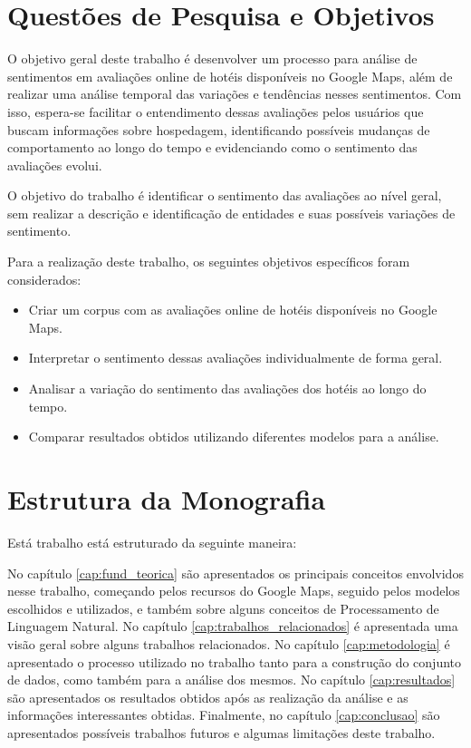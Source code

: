 \section{Questões de Pesquisa e Objetivos}


O objetivo geral deste trabalho é desenvolver um processo para   análise de sentimentos em avaliações online de hotéis disponíveis no Google Maps, além de realizar uma análise temporal das variações e tendências nesses sentimentos. Com isso, espera-se facilitar o entendimento dessas avaliações pelos usuários que buscam informações sobre hospedagem, identificando possíveis mudanças de comportamento ao longo do tempo e evidenciando como o sentimento das avaliações evolui.

O objetivo do trabalho é identificar o sentimento das avaliações ao nível geral, sem realizar a descrição e identificação de entidades e suas possíveis variações de sentimento.

Para a realização deste trabalho, os seguintes objetivos específicos foram considerados:

\begin{itemize}
	\item Criar um corpus com as avaliações online de hotéis disponíveis no Google Maps.
	\item Interpretar o sentimento dessas avaliações individualmente de forma geral.
	\item Analisar a variação do sentimento das avaliações dos hotéis ao longo do tempo.
	\item Comparar resultados obtidos utilizando diferentes modelos para a análise.
\end{itemize}


\section{Estrutura da Monografia}

Está trabalho está estruturado da seguinte maneira: 

No capítulo \ref{cap:fund_teorica} são apresentados os principais conceitos envolvidos nesse trabalho, começando pelos recursos do Google Maps, seguido pelos modelos escolhidos e utilizados, e também sobre alguns conceitos de Processamento de Linguagem Natural. No capítulo \ref{cap:trabalhos_relacionados} é apresentada uma visão geral sobre alguns trabalhos relacionados. No capítulo \ref{cap:metodologia} é apresentado o processo utilizado no trabalho tanto para a construção do conjunto de dados, como também para a análise dos mesmos. No capítulo \ref{cap:resultados} são apresentados os resultados obtidos após as realização da análise e as informações interessantes obtidas. Finalmente, no capítulo \ref{cap:conclusao} são apresentados possíveis trabalhos futuros e algumas limitações deste trabalho.
